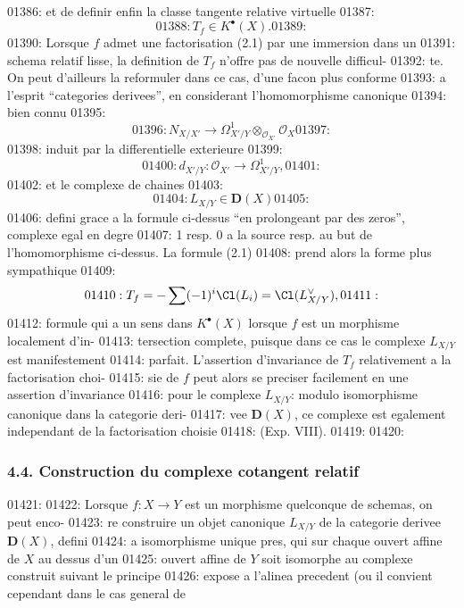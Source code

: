 01386: et de definir enfin la classe tangente relative virtuelle
01387: \[
01388: T_f \in K^{\bullet}(X).
01389: \]
01390: Lorsque $f$ admet une factorisation (2.1) par une immersion dans un
01391: schema relatif lisse, la definition de $T_f$ n'offre pas de nouvelle difficul-
01392: te. On peut d'ailleurs la reformuler dans ce cas, d'une facon plus conforme
01393: a l'esprit ``categories derivees'', en considerant l'homomorphisme canonique
01394: bien connu
01395: \begin{equation}
01396: N_{X/X'} \longrightarrow \Omega^1_{X'/Y} \otimes_{\mathcal{O}_{X'}} \mathcal{O}_X
01397: \end{equation}
01398: induit par la differentielle exterieure
01399: \[
01400: d_{X'/Y}: \mathcal{O}_{X'} \longrightarrow \Omega^1_{X'/Y},
01401: \]
01402: et le complexe de chaines
01403: \begin{equation}
01404: L_{X/Y} \in \mathbf{D}(X)
01405: \end{equation}
01406: defini grace a la formule ci-dessus ``en prolongeant par des zeros'', complexe egal en degre
01407: 1 resp. 0 a la source resp. au but de l'homomorphisme ci-dessus. La formule (2.1)
01408: prend alors la forme plus sympathique
01409: \begin{equation}
01410: T_f = -\sum (-1)^i \Cl(L_i) = \Cl(L_{X/Y}^{\vee}),
01411: \end{equation}
01412: formule qui a un sens dans $K^{\bullet}(X)$ lorsque $f$ est un morphisme localement d'in-
01413: tersection complete, puisque dans ce cas le complexe $L_{X/Y}$ est manifestement
01414: parfait. L'assertion d'invariance de $T_f$ relativement a la factorisation choi-
01415: sie de $f$ peut alors se preciser facilement en une assertion d'invariance
01416: pour le complexe $L_{X/Y}$: modulo isomorphisme canonique dans la categorie deri-
01417: vee $\mathbf{D}(X)$, ce complexe est egalement independant de la factorisation choisie
01418: (Exp. VIII).
01419: 
01420: \subsubsection*{4.4. Construction du complexe cotangent relatif}
01421: 
01422: Lorsque $f: X \to Y$ est un morphisme quelconque de schemas, on peut enco-
01423: re construire un objet canonique $L_{X/Y}$ de la categorie derivee $\mathbf{D}(X)$, defini
01424: a isomorphisme unique pres, qui sur chaque ouvert affine de $X$ au dessus d'un
01425: ouvert affine de $Y$ soit isomorphe au complexe construit suivant le principe
01426: expose a l'alinea precedent (ou il convient cependant dans le cas general de
